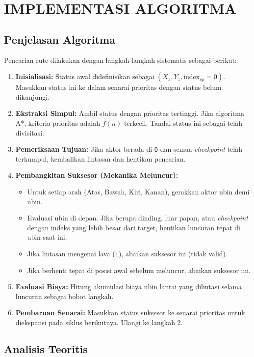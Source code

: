 \documentclass[11pt,a4paper]{article}
\begin{document}
\section{IMPLEMENTASI ALGORITMA}

\subsection{Penjelasan Algoritma}
Pencarian rute dilakukan dengan langkah-langkah sistematis sebagai berikut:
\begin{enumerate}[noitemsep]
    \item \textbf{Inisialisasi:} Status awal didefinisikan sebagai $(X_z, Y_z, \text{index}_{cp}=0)$. Masukkan status ini ke dalam senarai prioritas dengan status belum dikunjungi.
    \item \textbf{Ekstraksi Simpul:} Ambil status dengan prioritas tertinggi. Jika algoritma A*, kriteria prioritas adalah $f(n)$ terkecil. Tandai status ini sebagai telah divisitasi.
    \item \textbf{Pemeriksaan Tujuan:} Jika aktor berada di \texttt{O} dan semua \textit{checkpoint} telah terkumpul, kembalikan lintasan dan hentikan pencarian.
    \item \textbf{Pembangkitan Suksesor (Mekanika Meluncur):}
    \begin{itemize}[noitemsep]
        \item Untuk setiap arah (Atas, Bawah, Kiri, Kanan), gerakkan aktor ubin demi ubin.
        \item Evaluasi ubin di depan. Jika berupa dinding, luar papan, atau \textit{checkpoint} dengan indeks yang lebih besar dari target, hentikan luncuran tepat di ubin saat ini.
        \item Jika lintasan mengenai lava (\texttt{L}), abaikan suksesor ini (tidak valid).
        \item Jika berhenti tepat di posisi awal sebelum meluncur, abaikan suksesor ini.
    \end{itemize}
    \item \textbf{Evaluasi Biaya:} Hitung akumulasi biaya ubin lantai yang dilintasi selama luncuran sebagai bobot langkah.
    \item \textbf{Pembaruan Senarai:} Masukkan status suksesor ke senarai prioritas untuk diekspansi pada siklus berikutnya. Ulangi ke langkah 2.
\end{enumerate}

\subsection{Analisis Teoritis}
\end{document}
